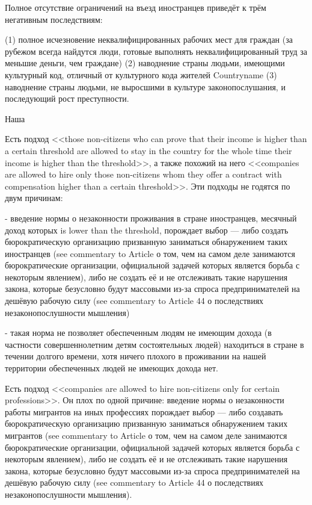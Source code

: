 \documentclass[11pt]{article}
\theoremstyle{remark}
\theoremstyle{definition}
\begin{document}
\color{blue}



Полное отсутствие ограничений на въезд иностранцев приведёт к трём негативным последствиям:

(1) полное исчезновение неквалифицированных рабочих мест для граждан (за рубежом всегда найдутся люди, готовые выполнять неквалифицированный труд за меньшие деньги, чем граждане)
(2) наводнение страны людьми, имеющими культурный код, отличный от культурного кода жителей Countryname
(3) наводнение страны людьми, не выросшими в культуре законопослушания, и последующий рост преступности.


Наша 





Есть подход <<those non-citizens who can prove that their income is higher than a certain threshold are allowed to stay in the country for the whole time their income is higher than the threshold>>, а также похожий на него <<companies are allowed to hire only those non-citizens whom they offer a contract with compensation higher than a certain threshold>>. Эти подходы не годятся по двум причинам:



- введение нормы о незаконности проживания в стране иностранцев, месячный доход которых is lower than the threshold, порождает выбор --- либо создать бюрократическую организацию призванную заниматься обнаружением таких иностранцев (see commentary to Article о том, чем на самом деле занимаются бюрократические организации, официальной задачей которых является борьба с некоторым явлением), либо не создать её и не отслеживать такие нарушения закона, которые безусловно будут массовыми из-за спроса предпринимателей на дешёвую рабочую силу (see commentary to Article 44 о последствиях незаконопослушности мышления)

- такая норма не позволяет обеспеченным людям не имеющим дохода (в частности совершеннолетним детям состоятельных людей) находиться в стране в течении долгого времени, хотя ничего плохого в проживании на нашей территории обеспеченных людей не имеющих дохода нет.



Есть подход <<companies are allowed to hire non-citizens only for certain professions>>. Он плох по одной причине: введение нормы о незаконности работы мигрантов на иных профессиях порождает выбор --- либо создавать бюрократическую организацию призванную заниматься обнаружением таких мигрантов (see commentary to Article о том, чем на самом деле занимаются бюрократические организации, официальной задачей которых является борьба с некоторым явлением), либо не создать её и не отслеживать такие нарушения закона, которые безусловно будут массовыми из-за спроса предпринимателей на дешёвую рабочую силу (see commentary to Article 44 о последствиях незаконопослушности мышления).
\end{document}
